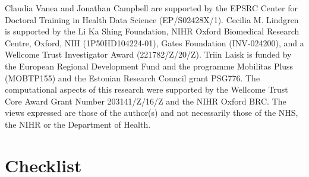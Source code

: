 \documentclass{article}
\begin{document}
\begin{ack}

Claudia Vanea and Jonathan Campbell are supported by the EPSRC Center for Doctoral Training in Health Data Science (EP/S02428X/1). Cecilia M. Lindgren is supported by the Li Ka Shing Foundation, NIHR Oxford Biomedical Research Centre, Oxford, NIH (1P50HD104224-01), Gates Foundation (INV-024200), and a Wellcome Trust Investigator Award (221782/Z/20/Z). Triin Laisk is funded by the European Regional Development Fund and the programme Mobilitas Pluss (MOBTP155) and the Estonian Research Council grant PSG776. The computational aspects of this research were supported by the Wellcome Trust Core Award Grant Number 203141/Z/16/Z and the NIHR Oxford BRC. The views expressed are those of the author(s) and not necessarily those of the NHS, the NIHR or the Department of Health.

\end{ack}




\pagebreak
\medskip


{
\small



}


\pagebreak
\section*{Checklist}
\end{document}
